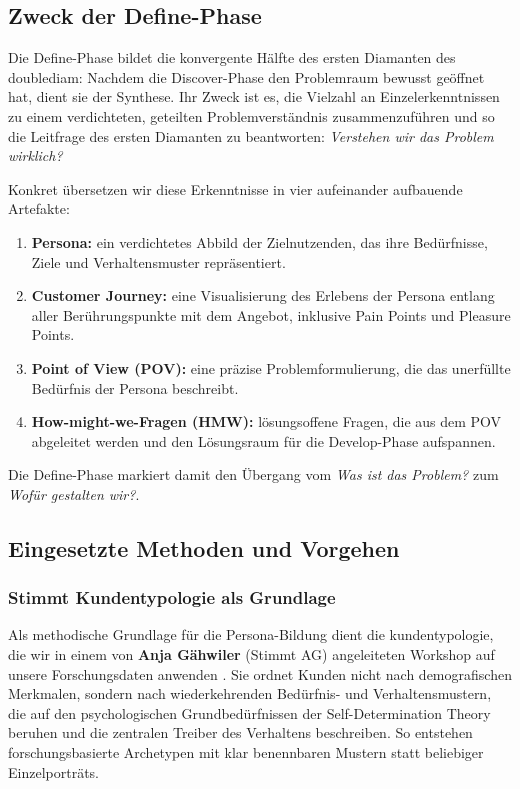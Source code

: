 \subsection{Zweck der Define-Phase}

Die Define-Phase bildet die konvergente Hälfte des ersten Diamanten des \gls{doublediam}: Nachdem die Discover-Phase den Problemraum bewusst geöffnet hat, dient sie der Synthese.
Ihr Zweck ist es, die Vielzahl an Einzelerkenntnissen zu einem verdichteten, geteilten Problemverständnis zusammenzuführen und so die Leitfrage des ersten Diamanten zu beantworten: \emph{Verstehen wir das Problem wirklich?}

Konkret übersetzen wir diese Erkenntnisse in vier aufeinander aufbauende Artefakte: 
\begin{enumerate}
  \item \textbf{Persona:} ein verdichtetes Abbild der Zielnutzenden, das ihre Bedürfnisse, Ziele und Verhaltensmuster repräsentiert.
  \item \textbf{Customer Journey:} eine Visualisierung des Erlebens der Persona entlang aller Berührungspunkte mit dem Angebot, inklusive Pain Points und Pleasure Points.
  \item \textbf{Point of View (POV):} eine präzise Problemformulierung, die das unerfüllte Bedürfnis der Persona beschreibt.
  \item \textbf{How-might-we-Fragen (HMW):} lösungsoffene Fragen, die aus dem POV abgeleitet werden und den Lösungsraum für die Develop-Phase aufspannen.
\end{enumerate}

Die Define-Phase markiert damit den Übergang vom \emph{Was ist das Problem?} zum \emph{Wofür gestalten wir?}.

\subsection{Eingesetzte Methoden und Vorgehen}

\subsubsection{Stimmt Kundentypologie als Grundlage}

Als methodische Grundlage für die Persona-Bildung dient die \gls{kundentypologie}, die wir in einem von \textbf{Anja Gähwiler} (Stimmt AG) angeleiteten Workshop auf unsere Forschungsdaten anwenden \parencite{gaehwiler2026}.
Sie ordnet Kunden nicht nach demografischen Merkmalen, sondern nach wiederkehrenden Bedürfnis- und Verhaltensmustern, die auf den psychologischen Grundbedürfnissen der Self-Determination Theory beruhen und die zentralen Treiber des Verhaltens beschreiben.
So entstehen forschungsbasierte Archetypen mit klar benennbaren Mustern statt beliebiger Einzelporträts.

